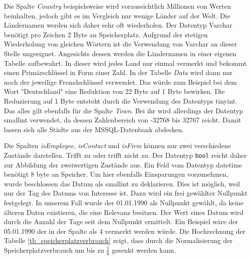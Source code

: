 Die Spalte \textit{Country} beispielsweise wird voraussichtlich Millionen von Werten beinhalten, jedoch gibt es im Vergleich nur wenige Länder auf der Welt. Die Ländernamen werden sich daher sehr oft wiederholen. Der Datentyp Varchar benötigt pro Zeichen 2 Byte an Speicherplatz. Aufgrund der stetigen Wiederholung von gleichen Wörtern ist die Verwendung von Varchar an dieser Stelle ungeeignet. Angesichts dessen werden die Ländernamen in einer eigenen Tabelle aufbewahrt. In dieser wird jedes Land nur einmal vermerkt und bekommt einen Primärschlüssel in Form einer Zahl. In der Tabelle \textit{Data} wird dann nur noch der jeweilige Fremdschlüssel verwendet. Das würde zum Beispiel bei dem Wort "Deutschland" eine Reduktion von 22 Byte auf 1 Byte bewirken. Die Reduzierung auf 1 Byte entsteht durch die Verwendung des Datentyps tinyint. Das alles gilt ebenfalls für die Spalte \textit{Town}. Bei ihr wird allerdings der Datentyp smallint verwendet, da dessen Zahlenbereich von -32768 bis 32767 reicht. Damit lassen sich alle Städte aus der MSSQL-Datenbank abdecken. 

Die Spalten \textit{isEmployee}, \textit{isContact} und \textit{isFirm} können nur zwei verschiedene Zustände darstellen. Trifft zu oder trifft nicht zu. Der Datentyp \texttt{bool} reicht daher zur Abbildung der zweiwertigen Zustände aus. Ein Feld vom Datentyp datetime benötigt 8 byte an Speicher. Um hier ebenfalls Einsparungen vorzunehmen, wurde beschlossen das Datum als smallint zu deklarieren. Dies ist möglich, weil nur der Tag des Datums von Interesse ist. Dazu wird ein frei gewählter Nullpunkt festgelegt. In unserem Fall wurde der 01.01.1990 als Nullpunkt gewählt, da keine älteren Daten existieren, die eine Relevanz besitzen. Der Wert eines Datum wird durch die Anzahl der Tage seit dem Nullpunkt ermittelt. Ein Beispiel wäre der 05.01.1990 der in der Spalte als 4 vermerkt werden würde. Die Hochrechnung der Tabelle \ref{tb_speicherplatzverbrauch} zeigt, dass durch die Normalisierung der Speicherplatzverbrauch um bis zu $ \frac{1}{6} $ gesenkt werden kann.

